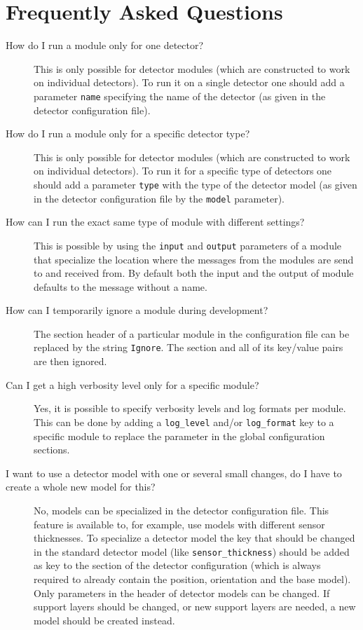 \section{Frequently Asked Questions}
\label{sec:faq}
\begin{description}
\item[How do I run a module only for one detector?] This is only possible for detector modules (which are constructed to work on individual detectors). To run it on a single detector one should add a parameter \texttt{name} specifying the name of the detector (as given in the detector configuration file).
\item[How do I run a module only for a specific detector type?] This is only possible for detector modules (which are constructed to work on individual detectors). To run it for a specific type of detectors one should add a parameter \texttt{type} with the type of the detector model (as given in the detector configuration file by the \texttt{model} parameter).
\item[How can I run the exact same type of module with different settings?] This is possible by using the \texttt{input} and \texttt{output} parameters of a module that specialize the location where the messages from the modules are send to and received from. By default both the input and the output of module defaults to the message without a name.
\item[How can I temporarily ignore a module during development?] The section header of a particular module in the configuration file can be replaced by the string \texttt{Ignore}. The section and all of its key/value pairs are then ignored.
\item[Can I get a high verbosity level only for a specific module?] Yes, it is possible to specify verbosity levels and log formats per module. This can be done by adding a \texttt{log\_level} and/or \texttt{log\_format} key to a specific module to replace the parameter in the global configuration sections.
\item[I want to use a detector model with one or several small changes, do I have to create a whole new model for this?] No, models can be specialized in the detector configuration file. This feature is available to, for example, use models with different sensor thicknesses. To specialize a detector model the key that should be changed in the standard detector model (like \texttt{sensor\_thickness}) should be added as key to the section of the detector configuration (which is always required to already contain the position, orientation and the base model). Only parameters in the header of detector models can be changed. If support layers should be changed, or new support layers are needed, a new model should be created instead.

\end{description}
